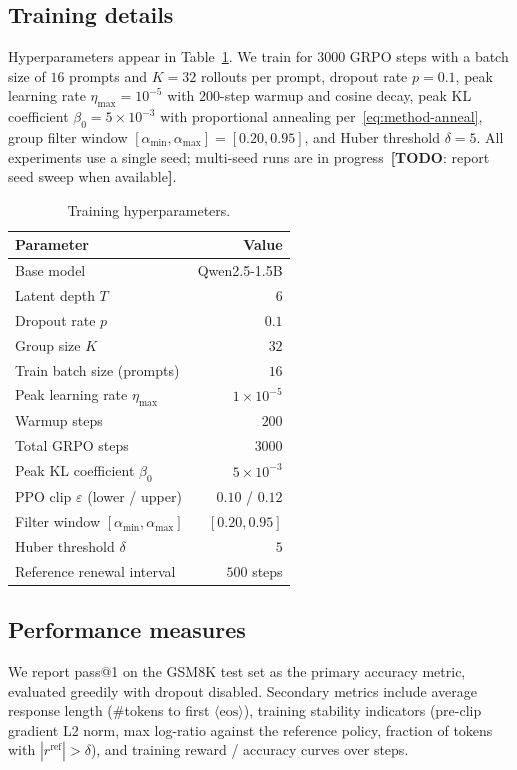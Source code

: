 \documentclass[11pt]{article}
\theoremstyle{definition}
\theoremstyle{remark}
\newcommand{\eps}{\varepsilon}
\newcommand{\answerTODO}[1][]{{\color{red}\textbf{[TODO}#1\textbf{]}}}
\begin{document}
\subsection{Training details}
\label{sec:setup-training}

Hyperparameters appear in Table~\ref{tab:hparams}.  We train for
$3000$ GRPO steps with a batch size of $16$ prompts and $K = 32$
rollouts per prompt, dropout rate $p = 0.1$, peak learning rate
$\eta_{\max} = 10^{-5}$ with $200$-step warmup and cosine decay, peak
KL coefficient $\beta_0 = 5 \times 10^{-3}$ with proportional
annealing per~\eqref{eq:method-anneal}, group filter window
$[\alpha_{\min}, \alpha_{\max}] = [0.20, 0.95]$, and Huber threshold
$\delta = 5$.  All experiments use a single seed; multi-seed runs
are in progress~\answerTODO[: report seed sweep when available].

\begin{table}[h]
\centering
\caption{Training hyperparameters.}
\label{tab:hparams}
\begin{tabular}{lr}
\toprule
Parameter & Value \\
\midrule
Base model & Qwen2.5-1.5B \\
Latent depth $T$ & $6$ \\
Dropout rate $p$ & $0.1$ \\
Group size $K$ & $32$ \\
Train batch size (prompts) & $16$ \\
Peak learning rate $\eta_{\max}$ & $1 \times 10^{-5}$ \\
Warmup steps & $200$ \\
Total GRPO steps & $3000$ \\
Peak KL coefficient $\beta_0$ & $5 \times 10^{-3}$ \\
PPO clip $\eps$ (lower / upper) & $0.10$ / $0.12$ \\
Filter window $[\alpha_{\min}, \alpha_{\max}]$ & $[0.20, 0.95]$ \\
Huber threshold $\delta$ & $5$ \\
Reference renewal interval & $500$ steps \\
\bottomrule
\end{tabular}
\end{table}

\subsection{Performance measures}
\label{sec:setup-metrics}

We report pass@1 on the \textsc{GSM8K} test set as the primary
accuracy metric, evaluated greedily with dropout disabled.  Secondary
metrics include average response length (\#tokens to first
$\langle\text{eos}\rangle$), training stability indicators
(pre-clip gradient L2 norm, max log-ratio against the reference
policy, fraction of tokens with $|r^{\mathrm{ref}}| > \delta$), and
training reward / accuracy curves over steps.
\end{document}
